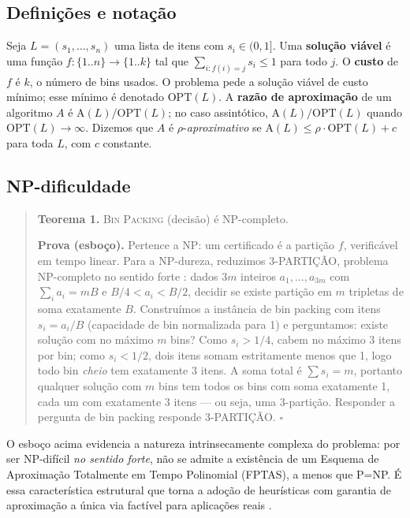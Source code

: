 \documentclass[12pt]{article}
\begin{document}
\subsection{Definições e notação}

Seja $L = (s_1, \ldots, s_n)$ uma lista de itens com $s_i \in (0,1]$. Uma \textbf{solução viável} é uma função $f: \{1..n\} \rightarrow \{1..k\}$ tal que $\sum_{i: f(i)=j} s_i \leq 1$ para todo $j$. O \textbf{custo} de $f$ é $k$, o número de bins usados. O problema pede a solução viável de custo mínimo; esse mínimo é denotado $\mathrm{OPT}(L)$. A \textbf{razão de aproximação} de um algoritmo $A$ é $\mathrm{A}(L)/\mathrm{OPT}(L)$; no caso assintótico, $\mathrm{A}(L)/\mathrm{OPT}(L)$ quando $\mathrm{OPT}(L) \rightarrow \infty$. Dizemos que $A$ é $\rho$-\textit{aproximativo} se $\mathrm{A}(L) \leq \rho \cdot \mathrm{OPT}(L) + c$ para toda $L$, com $c$ constante.

\subsection{NP-dificuldade}

\begin{quote}
\textbf{Teorema 1.} \textsc{Bin Packing} (decisão) é NP-completo.

\textbf{Prova (esboço).} Pertence a NP: um certificado é a partição $f$, verificável em tempo linear. Para a NP-dureza, reduzimos 3-PARTIÇÃO, problema NP-completo no sentido forte \cite{garey1979}: dados $3m$ inteiros $a_1, \ldots, a_{3m}$ com $\sum_i a_i = mB$ e $B/4 < a_i < B/2$, decidir se existe partição em $m$ tripletas de soma exatamente $B$. Construímos a instância de bin packing com itens $s_i = a_i / B$ (capacidade de bin normalizada para 1) e perguntamos: existe solução com no máximo $m$ bins? Como $s_i > 1/4$, cabem no máximo 3 itens por bin; como $s_i < 1/2$, dois itens somam estritamente menos que 1, logo todo bin \textit{cheio} tem exatamente 3 itens. A soma total é $\sum s_i = m$, portanto qualquer solução com $m$ bins tem todos os bins com soma exatamente 1, cada um com exatamente 3 itens --- ou seja, uma 3-partição. Responder a pergunta de bin packing responde 3-PARTIÇÃO. \hfill$\square$
\end{quote}

O esboço acima evidencia a natureza intrinsecamente complexa do problema: por ser NP-difícil \textit{no sentido forte}, não se admite a existência de um Esquema de Aproximação Totalmente em Tempo Polinomial (FPTAS), a menos que P=NP. É essa característica estrutural que torna a adoção de heurísticas com garantia de aproximação a única via factível para aplicações reais \cite{williamson2011}.
\end{document}
